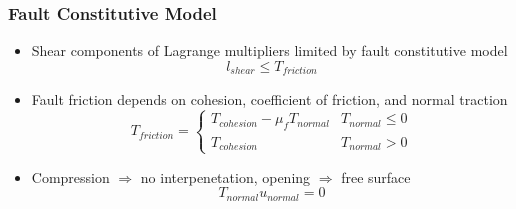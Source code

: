 \documentclass{beamer}
\begin{document}
\begin{frame}
  \frametitle{Fault Constitutive Model}

  \begin{itemize}
  \item Shear components of Lagrange multipliers limited by fault
    constitutive model
    \begin{equation}
      l_\mathit{shear} \leq T_\mathit{friction}
    \end{equation}
  \item Fault friction depends on cohesion, coefficient of friction,
    and normal traction
    \begin{equation}
      T_\mathit{friction} = \left\{ \begin{array}{ll}
          T_\mathit{cohesion} - \mu_\mathit{f} T_\mathit{normal} &
          T_\mathit{normal} \leq 0 \\
          T_\mathit{cohesion} & T_\mathit{normal} > 0
        \end{array} \right.
    \end{equation}
  \item Compression $\Rightarrow$ no interpenetation, opening
    $\Rightarrow$ free surface
    \begin{equation}
      T_\mathit{normal} u_\mathit{normal} = 0 
    \end{equation}
  \end{itemize}
  
\end{frame}
\end{document}
